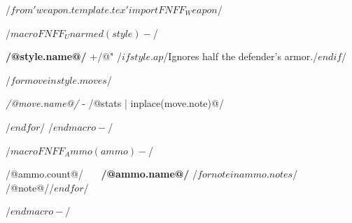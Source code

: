 /$from 'weapon.template.tex' import FNFF_Weapon $/

/$ macro FNFF_Unarmed(style) -$/
\begin{minipage}{\columnwidth}
\noindent \textbf{ /@style.name@/ } +/@"%
/$if style.ap$/Ignores half the defender's armor./$endif$/
\end{minipage}

/$for move in style.moves$/
\begin{minipage}{\columnwidth}
\small
\noindent \textit{ /@move.name@/ } - /@stats | inplace(move.note)@/
\normalsize
\end{minipage}

/$endfor$/
/$ endmacro -$/

/$ macro FNFF_Ammo(ammo) -$/
\begin{minipage}{\columnwidth}
\noindent /@ammo.count@/\ \ \  \textbf{ /@ammo.name@/ }
/$ for note in ammo.notes $/\\/@note@//$endfor$/
\end{minipage}
/$ endmacro -$/

